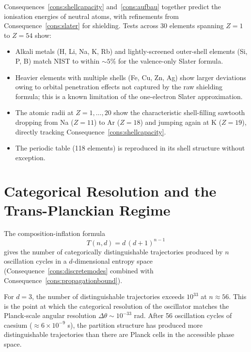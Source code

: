Consequences~\ref{cons:shellcapacity} and~\ref{cons:aufbau} together predict
the ionisation energies of neutral atoms, with refinements from
Consequence~\ref{cons:slater} for shielding.  Tests across 30 elements
spanning $Z=1$ to $Z=54$ show:

\begin{itemize}
  \item Alkali metals (H, Li, Na, K, Rb) and lightly-screened outer-shell
    elements (Si, P, B) match NIST to within $\sim 5$\% for the valence-only
    Slater formula.
  \item Heavier elements with multiple shells (Fe, Cu, Zn, Ag) show larger
    deviations owing to orbital penetration effects not captured by the
    raw shielding formula; this is a known limitation of the one-electron
    Slater approximation.
  \item The atomic radii at $Z=1,\ldots,20$ show the characteristic
    shell-filling sawtooth dropping from Na ($Z=11$) to Ar ($Z=18$) and
    jumping again at K ($Z=19$), directly tracking Consequence~\ref{cons:shellcapacity}.
  \item The periodic table (118 elements) is reproduced in its shell
    structure without exception.
\end{itemize}

\section{Categorical Resolution and the Trans-Planckian Regime}
\label{sec:transplanckian-ch25}

The composition-inflation formula
\begin{equation}
  T(n,d) = d\,(d+1)^{n-1}
  \label{eq:compinflation-ch25}
\end{equation}
gives the number of categorically distinguishable trajectories produced by
$n$ oscillation cycles in a $d$-dimensional entropy space (Consequence~\ref{cons:discretemodes}
combined with Consequence~\ref{cons:propagationbound}).

For $d=3$, the number of distinguishable trajectories exceeds $10^{33}$ at
$n\approx 56$.  This is the point at which the categorical resolution of
the oscillator matches the Planck-scale angular resolution
$\Delta\theta\sim 10^{-33}$ rad.  After 56 oscillation cycles of caesium
($\approx 6\times 10^{-9}$ s), the partition structure has produced more
distinguishable trajectories than there are Planck cells in the accessible
phase space.


